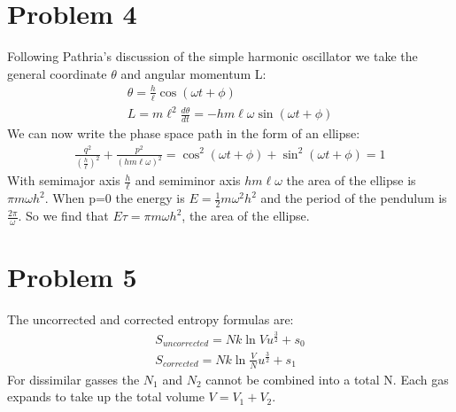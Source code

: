 \documentclass[a4paper,12pt]{article}
\numberwithin{equation}{section}
\begin{document}
\section{Problem 4}
Following Pathria's discussion of the simple harmonic oscillator we take the general coordinate $\theta$ and angular momentum L:
\begin{gather}
 \theta=\frac{h}{\ell}\cos{(\omega t+\phi)}\\
 L=m\ell^2\frac{d\theta}{dt}=-hm\ell\omega\sin{(\omega t+\phi)}
\end{gather}
We can now write the phase space path in the form of an ellipse:
\begin{gather}
 \frac{q^2}{(\frac{h}{\ell})^2}+\frac{p^2}{(hm\ell\omega)^2}=
 \cos^2{(\omega t+\phi)}+\sin^2{(\omega t+\phi)}=1
\end{gather}
With semimajor axis $\frac{h}{\ell}$ and semiminor axis $hm\ell\omega$ the area of the ellipse is $\pi m\omega h^2$.
When p=0 the energy is $E=\frac{1}{2}m\omega^2h^2$ and the period of the pendulum is $\frac{2\pi}{\omega}$.
So we find that $E\tau = \pi m\omega h^2$, the area of the ellipse.

\section{Problem 5}
The uncorrected and corrected entropy formulas are:
\begin{gather}
 S_{uncorrected}=Nk\ln{Vu^{\frac{3}{2}}}+s_0\\
 S_{corrected}=Nk\ln{\frac{V}{N}u^{\frac{3}{2}}}+s_1
\end{gather}
For dissimilar gasses the $N_1$ and $N_2$ cannot be combined into a total N.
Each gas expands to take up the total volume $V=V_1+V_2$.
\begin{gather}
 
\end{gather}
\end{document}
